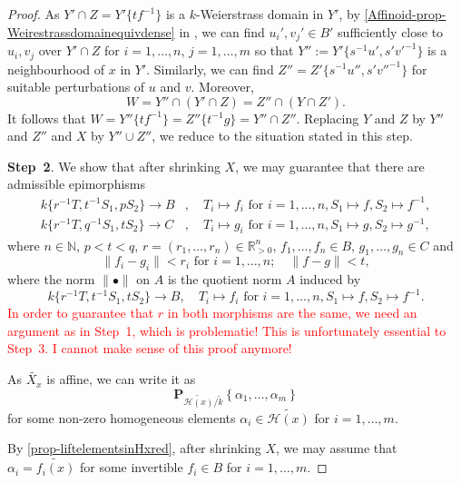 \begin{proof}
    As $Y'\cap Z=Y'\{tf^{-1}\}$ is a $k$-Weierstrass domain in $Y'$, by \cref{Affinoid-prop-Weirestrassdomainequivdense} in ,
    we can find $u_i',v_j'\in B'$ sufficiently close to $u_i,v_j$ over $Y'\cap Z$ for $i=1,\dots,n$, $j=1,\ldots,m$ so that $Y'':=Y'\{s^{-1}u',s'v'^{-1}\}$ is a neighbourhood of $x$ in $Y'$. Similarly, we can find $Z''=Z'\{s^{-1}u'',s'v''^{-1}\}$ for suitable perturbations of $u$ and $v$. Moreover,
    \[
        W=Y''\cap (Y'\cap Z)=Z''\cap (Y\cap Z').  
    \]
    It follows that $W=Y''\{tf^{-1}\}=Z''\{t^{-1}g\}=Y''\cap Z''$. Replacing $Y$ and $Z$ by $Y''$ and $Z''$ and $X$ by $Y''\cup Z''$, we reduce to the situation stated in this step.


    \textbf{Step~2}. We show that after shrinking $X$, we may guarantee that there are admissible epimorphisms 
    \begin{equation}\label{eq-admepiintermstep}
        \begin{aligned}
        k\{r^{-1}T,t^{-1}S_1,pS_2\}\rightarrow B &,\quad T_i\mapsto f_i \text{ for } i=1,\ldots,n,S_1\mapsto f ,S_2\mapsto f^{-1},\\
        k\{r^{-1}T,q^{-1}S_1,tS_2\}\rightarrow C &,\quad T_i\mapsto g_i \text{ for } i=1,\ldots,n,S_1\mapsto g ,S_2\mapsto g^{-1},
        \end{aligned}
    \end{equation}
    where $n\in \mathbb{N}$, $p<t<q$, $r=(r_1,\ldots,r_n)\in \mathbb{R}^n_{>0}$, $f_1,\ldots,f_n\in B$, $g_1,\ldots,g_n\in C$ and 
    \[
        \|f_i-g_i\|<r_i\text{ for }i=1,\ldots,n;\quad  \|f-g\|< t, 
    \]
    where the norm $\|\bullet\|$ on $A$ is the quotient norm $A$ induced by
    \[
        k\{r^{-1}T,t^{-1}S_1,tS_2\}\rightarrow B,\quad T_i\mapsto f_i\text{ for } i=1,\ldots,n, S_1\mapsto f, S_2\mapsto f^{-1}.
    \]
    \textcolor{red}{In order to guarantee that $r$ in both morphisms are the same, we need an argument as in Step~1, which is problematic! This is unfortunately essential to Step~3. I cannot make sense of this proof anymore!}

    As $\widetilde{X_x}$ is affine, we can write it as 
    \[
        \mathbf{P}_{\widetilde{\mathscr{H}(x)}/\tilde{k}}\left\{\alpha_1,\ldots,\alpha_m\right\}  
    \]
    for some non-zero homogeneous elements $\alpha_i\in \widetilde{\mathscr{H}(x)}$ for $i=1,\ldots,m$. 
    
    By \cref{prop-liftelementsinHxred}, after shrinking $X$, we may assume that $\alpha_i=\widetilde{f_i(x)}$ for some invertible $f_i\in B$ for $i=1,\ldots,m$. 
    

\end{proof}
